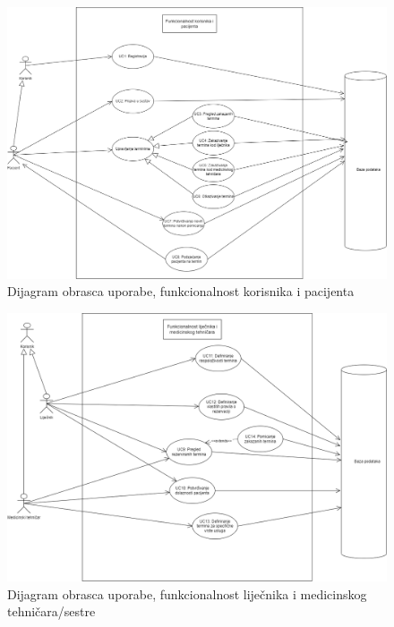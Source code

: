 				
					\begin{figure}[H]
			            \includegraphics[width=\textwidth]{slike/pacijent_usecase_v2.png} %
			            \caption{Dijagram obrasca uporabe, funkcionalnost korisnika i pacijenta}
			            \label{fig:uc1} %
		            \end{figure}
				
				    \begin{figure}[H]
			            \includegraphics[width=\textwidth]{slike/lijecnik_tehn_usecase_v2.png} %
			            \caption{Dijagram obrasca uporabe, funkcionalnost liječnika i medicinskog tehničara/sestre}
			            \label{fig:uc2} %
		            \end{figure}
				
